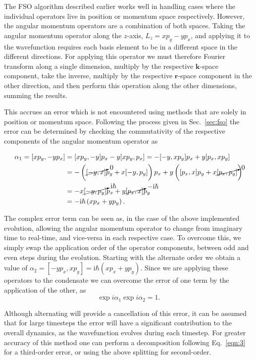 The FSO algorithm described earlier works well in handling cases where the individual operators live in position or momentum space respectively. However, the angular momentum operators are a combination of both spaces. Taking the angular momentum operator along the $z$-axis, $L_z = xp_y - yp_x$, and applying it to the wavefunction requires each basis element to be in a different space in the different directions. For applying this operator we must therefore Fourier transform along a single dimension, multiply by the respective $\mathbf{k}$-space component, take the inverse, multiply by the respective $\mathbf{r}$-space component in the other direction, and then perform this operation along the other dimensions, summing the results.

This accrues an error which is not encountered using methods that are solely in position or momentum space. Following the process given in Sec.~\ref{sec:fso} the error can be determined by checking the commutativity of the respective components of the angular momentum operator as

 \begin{align}
 	\alpha_1 = [x p_y,-y p_x] &= [x p_y,-y] p_x  -  y[x p_y,p_x] = -[-y,x p_y] p_x + y [p_x, x p_y] \nonumber \\
 		&= -\left( {\cancelto{0}{[-y,x]}} p_y + x [-y,p_y] \right) p_x + y \left( [p_x,x] p_y + x {\cancelto{0}{[p_x,p_y]}} \right) \nonumber \\
 		&= -x {\cancelto{\textrm{i}\hbar}{[-y, p_y]}} p_x + y {\cancelto{-\textrm{i}\hbar}{[p_x,x]}} p_y \nonumber \\
        &= -\textrm{i}\hbar \left(x p_x + y p_y \right).
 \end{align}

 The complex error term can be seen as, in the case of the above implemented evolution, allowing the angular momentum operator to change from imaginary time to real-time, and vice-versa in each respective case. To overcome this, we simply swap the application order of the operator components, between odd and even steps during the evolution. Starting with the alternate order we obtain a value of $\alpha_2 = [-y p_x, x p_y] = \textrm{i}\hbar \left(x p_x + y p_y \right)$. Since we are applying these operators to the condensate we can overcome the error of one term by the application of the other, as
 \begin{equation}
 \exp{i \alpha_1}\exp{i \alpha_2} = 1.
 \end{equation}

 Although alternating will provide a cancellation of this error, it can be assumed that for large timesteps the error will have a significant contribution to the overall dynamics, as the wavefunction evolves during each timestep. For greater accuracy of this method one can perform a decomposition following Eq.~\eqref{eqn:3} for a third-order error, or using the above splitting for second-order.

